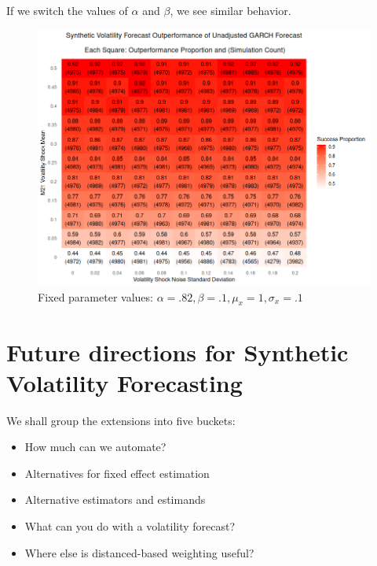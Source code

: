 \documentclass[9pt]{beamer}
\theoremstyle{definition}
\begin{document}
\begin{frame}
    \fontsize{8pt}{9pt}

    If we switch the values of $\alpha$ and $\beta$, we see similar behavior. 
    \begin{figure}[h!]
      \begin{center}
        \includegraphics[scale=.29]{simulation_plots/standard_simulation_alpha_.82_beta_.1.png}
        \caption{Fixed parameter values: $\alpha = .82, \beta = .1, \mu_{x} = 1, \sigma_{x} = .1$}
        \label{fig:heavy_alpha}
      \end{center}
      \end{figure}

\end{frame}


\section{Future directions for Synthetic Volatility Forecasting}

\begin{frame}
We shall group the extensions into five buckets:
\begin{itemize}
    \item How much can we automate?
    \item Alternatives for fixed effect estimation
    \item Alternative estimators and estimands
    \item What can you do with a volatility forecast?
    \item Where else is distanced-based weighting useful?
\end{itemize}
\end{frame}
\end{document}
